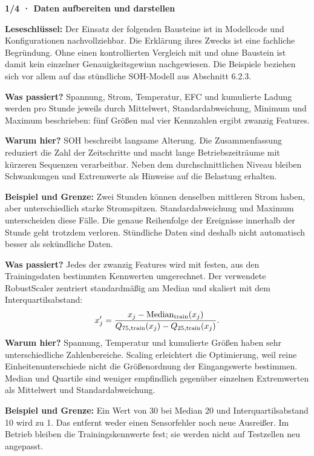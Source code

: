 \textbf{1/4 · Daten aufbereiten und darstellen}

\textbf{Leseschlüssel:} Der Einsatz der folgenden Bausteine ist in Modellcode und Konfigurationen nachvollziehbar. Die Erklärung ihres Zwecks ist eine fachliche Begründung. Ohne einen kontrollierten Vergleich mit und ohne Baustein ist damit kein einzelner Genauigkeitsgewinn nachgewiesen. Die Beispiele beziehen sich vor allem auf das stündliche SOH-Modell aus Abschnitt 6.2.3.

\textbf{Was passiert?} Spannung, Strom, Temperatur, EFC und kumulierte Ladung werden pro Stunde jeweils durch Mittelwert, Standardabweichung, Minimum und Maximum beschrieben: fünf Größen mal vier Kennzahlen ergibt zwanzig Features.

\textbf{Warum hier?} SOH beschreibt langsame Alterung. Die Zusammenfassung reduziert die Zahl der Zeitschritte und macht lange Betriebszeiträume mit kürzeren Sequenzen verarbeitbar. Neben dem durchschnittlichen Niveau bleiben Schwankungen und Extremwerte als Hinweise auf die Belastung erhalten.

\textbf{Beispiel und Grenze:} Zwei Stunden können denselben mittleren Strom haben, aber unterschiedlich starke Stromspitzen. Standardabweichung und Maximum unterscheiden diese Fälle. Die genaue Reihenfolge der Ereignisse innerhalb der Stunde geht trotzdem verloren. Stündliche Daten sind deshalb nicht automatisch besser als sekündliche Daten.

\textbf{Was passiert?} Jedes der zwanzig Features wird mit festen, aus den Trainingsdaten bestimmten Kennwerten umgerechnet. Der verwendete RobustScaler zentriert standardmäßig am Median und skaliert mit dem Interquartilsabstand:
\[
x'_j=\frac{x_j-\operatorname{Median}_{\rm train}(x_j)}{Q_{75,\rm train}(x_j)-Q_{25,\rm train}(x_j)}.
\]
\textbf{Warum hier?} Spannung, Temperatur und kumulierte Größen haben sehr unterschiedliche Zahlenbereiche. Scaling erleichtert die Optimierung, weil reine Einheitenunterschiede nicht die Größenordnung der Eingangswerte bestimmen. Median und Quartile sind weniger empfindlich gegenüber einzelnen Extremwerten als Mittelwert und Standardabweichung.

\textbf{Beispiel und Grenze:} Ein Wert von 30 bei Median 20 und Interquartilsabstand 10 wird zu 1. Das entfernt weder einen Sensorfehler noch neue Ausreißer. Im Betrieb bleiben die Trainingskennwerte fest; sie werden nicht auf Testzellen neu angepasst.

